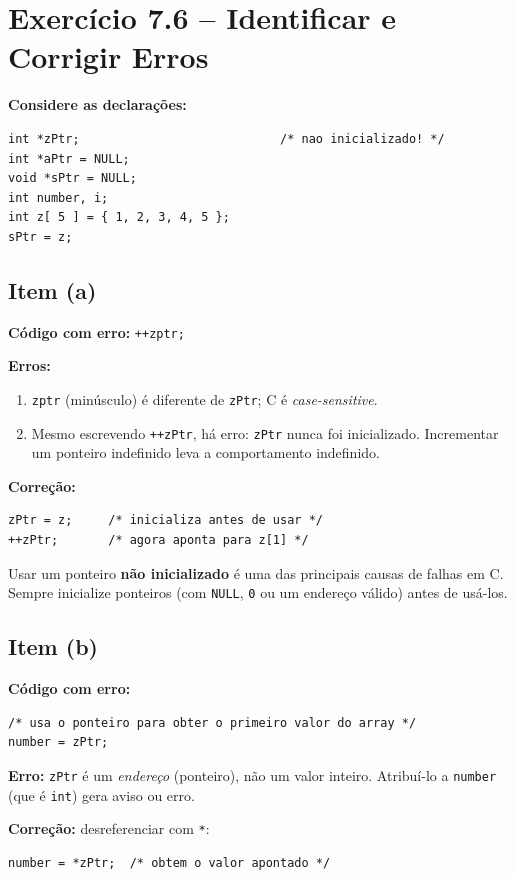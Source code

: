 \documentclass[12pt,a4paper]{article}
\begin{document}
\newpage

\section{Exercício 7.6 -- Identificar e Corrigir Erros}

\textbf{Considere as declarações:}
\begin{lstlisting}
int *zPtr;                            /* nao inicializado! */
int *aPtr = NULL;
void *sPtr = NULL;
int number, i;
int z[ 5 ] = { 1, 2, 3, 4, 5 };
sPtr = z;
\end{lstlisting}

\subsection*{Item (a)}
\begin{respostabox}
\textbf{Código com erro:} \texttt{++zptr;}

\textbf{Erros:}
\begin{enumerate}[noitemsep]
  \item \texttt{zptr} (minúsculo) é diferente de \texttt{zPtr}; C é \textit{case-sensitive}.
  \item Mesmo escrevendo \texttt{++zPtr}, há erro: \texttt{zPtr} nunca foi inicializado.
  Incrementar um ponteiro indefinido leva a comportamento indefinido.
\end{enumerate}

\textbf{Correção:}
\begin{lstlisting}
zPtr = z;     /* inicializa antes de usar */
++zPtr;       /* agora aponta para z[1] */
\end{lstlisting}

\begin{erroco}
  Usar um ponteiro \textbf{não inicializado} é uma das principais causas de
  falhas em C. Sempre inicialize ponteiros (com \texttt{NULL}, \texttt{0} ou
  um endereço válido) antes de usá-los.
\end{erroco}
\end{respostabox}

\subsection*{Item (b)}
\begin{respostabox}
\textbf{Código com erro:}
\begin{lstlisting}
/* usa o ponteiro para obter o primeiro valor do array */
number = zPtr;
\end{lstlisting}

\textbf{Erro:} \texttt{zPtr} é um \textit{endereço} (ponteiro), não um valor inteiro.
Atribuí-lo a \texttt{number} (que é \texttt{int}) gera aviso ou erro.

\textbf{Correção:} desreferenciar com \texttt{*}:
\begin{lstlisting}
number = *zPtr;  /* obtem o valor apontado */
\end{lstlisting}
\end{respostabox}
\end{document}
